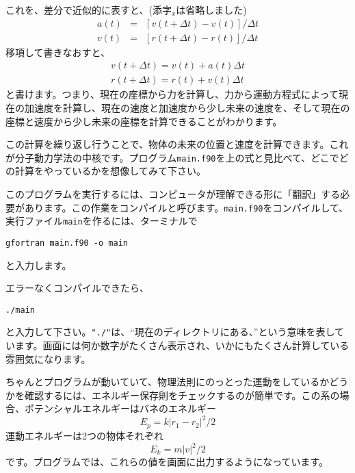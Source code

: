 \documentclass[a4,10pt]{article}
\begin{document}
これを、差分で近似的に表すと、(添字$_x$は省略しました)
\begin{eqnarray}
a(t)&=&[ v(t+\Delta t) - v(t) ] / \Delta t\\
v(t)&=&[ r(t+\Delta t) - r(t) ] / \Delta t
\end{eqnarray}
移項して書きなおすと、
\begin{eqnarray}
v(t+\Delta t) = v(t) + a(t) \Delta t\\
r(t+\Delta t) = r(t) + v(t) \Delta t
\end{eqnarray}
と書けます。つまり、現在の座標から力を計算し、力から運動方程式によって現在の加速度を計算し、現在の速度と加速度から少し未来の速度を、そして現在の座標と速度から少し未来の座標を計算できることがわかります。

この計算を繰り返し行うことで、物体の未来の位置と速度を計算できます。これが分子動力学法の中核です。プログラム{\tt main.f90}を上の式と見比べて、どこでどの計算をやっているかを想像してみて下さい。

このプログラムを実行するには、コンピュータが理解できる形に「翻訳」する必要があります。この作業をコンパイルと呼びます。{\tt main.f90}をコンパイルして、実行ファイル{\tt main}を作るには、ターミナルで
\begin{screen}\begin{verbatim}
gfortran main.f90 -o main
\end{verbatim}\end{screen}
と入力します。

エラーなくコンパイルできたら、
\begin{screen}\begin{verbatim}
./main
\end{verbatim}\end{screen}
と入力して下さい。{\tt "./"}は、``現在のディレクトリにある、''という意味を表しています。画面には何か数字がたくさん表示され、いかにもたくさん計算している雰囲気になります。

ちゃんとプログラムが動いていて、物理法則にのっとった運動をしているかどうかを確認するには、エネルギー保存則をチェックするのが簡単です。この系の場合、ポテンシャルエネルギーはバネのエネルギー
\begin{equation}\label{eq:e_sp}
E_p = k \left| r_1 - r_2 \right|^2 / 2
\end{equation}
運動エネルギーは2つの物体それぞれ
\begin{equation}
E_k = m \left| v \right|^2 / 2
\end{equation}
です。プログラムでは、これらの値を画面に出力するようになっています。
\end{document}
